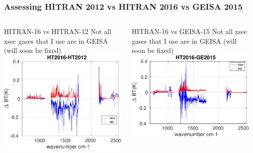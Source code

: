 \documentclass[10pt,t]{beamer}
\begin{document}
\begin{frame}
  \frametitle{Assessing HITRAN 2012 vs HITRAN 2016 vs GEISA 2015}

  \begin{columns}

    \begin{column}{0.55\columnwidth}
      \begin{block}{HITRAN-16 vs HITRAN-12}
        \small   Not all xsec gases that I use are in GEISA (will soon be fixed)\\
        \vspace{0.2in}
        \includegraphics[width=\linewidth]{Figs/FigsH16_G15/h16_h12_v2.pdf}
      \end{block}
    \end{column}

    \begin{column}{0.55\columnwidth}
      \begin{block}{HITRAN-16 vs GEISA-15}
        \small   Not all xsec gases that I use are in GEISA (will soon be fixed)\\
        \vspace{0.2in}
        \includegraphics[width=\linewidth]{Figs/FigsH16_G15/h16_g15_v2.pdf}
      \end{block}
    \end{column}


\end{columns}
\end{frame}
\end{document}
